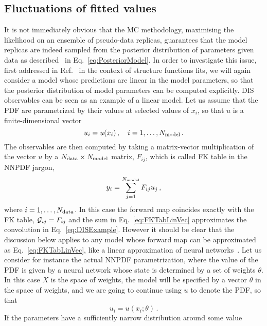 \subsection{Fluctuations of fitted values}
\label{sec:fluct-fit-values}

It is not immediately obvious that the MC methodology, maximising the likelihood
on an ensemble of pseudo-data replicas, guarantees that the model replicas are
indeed sampled from the posterior distribution of parameters given data as
described \eg\ in Eq.~\ref{eq:PosteriorModel}. In order to investigate this
issue, first addressed in Ref.~\cite{Forte:2002fg} in the context of structure functions fits,
we will again consider a model whose predictions are linear in the model
parameters, so that the posterior distribution of model parameters can be
computed explicitly. DIS observables can be seen as an example of a linear
model. Let us assume that the PDF are parametrized by their values at selected
values of $x_i$, so that $u$ is a finite-dimensional vector 
\begin{equation}
    \label{eq:Uvector}
    u_i = u(x_i)\, , \quad i = 1, \ldots, N_{\rm model}\, .    
\end{equation}
The observables are then computed by taking a matrix-vector multiplication of
the vector $u$ by a $N_{\rm data} \times N_{\rm model}$ matrix, $F_{ij}$, which is called FK
table in the NNPDF jargon, 
\begin{equation}
    \label{eq:FKTabLinVec}
    y_i = \sum_{j=1}^{N_{\rm model}} F_{ij} u_j\, ,
\end{equation}
where $i=1,\ldots,N_{\rm data}$. In this case the forward map coincides exactly with
the FK table, $\mathcal{G}_{ij} = F_{ij}$ and the sum in Eq.~\ref{eq:FKTabLinVec}
approximates the convolution in Eq.~\ref{eq:DISExample}. However it should be
clear that the discussion below applies to any model whose forward map can be
approximated as Eq.~\ref{eq:FKTabLinVec}, like a linear approximation of
neural networks~\cite{ADVANI2020428}. Let us consider for instance the actual
NNPDF parametrization, where the value of the PDF is given by a neural network
whose state is determined by a set of weights $\theta$. In this case $X$ is the
space of weights, the model will be specified by a vector $\theta$ in the space
of weights, and we are going to continue using $u$ to denote the PDF, so that 
\begin{equation}
    \label{eq:WeightsParam}
    u_i = u(x_i; \theta)\, .
\end{equation}
If the parameters have a sufficiently narrow distribution around some value

